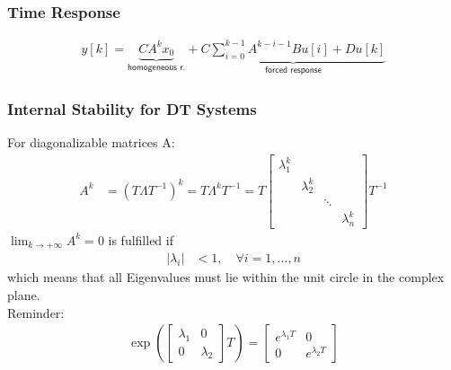 \subsubsection{Time Response}
\noindent\begin{align*}
    y[k]=\underbrace{CA^{k}x_0}_{\textsf{homogeneous r.}} + \underbrace{C\sum_{i=0}^{k-1}A^{k-i-1}Bu[i]+Du[k]}_{\textsf{forced response}}
\end{align*}
\subsubsection{Internal Stability for DT Systems}

For diagonalizable matrices A:\
\noindent\begin{align*}
    A^k & ={(T\Lambda T^{-1})}^k=T\Lambda^{k}T^{-1}=T\begin{bmatrix}\lambda_1^k&&&\\&\lambda_2^k&&\\&&\ddots&\\&&&\lambda_n^k\end{bmatrix}T^{-1}
\end{align*}
$\lim_{k\to+\infty}A^k=0$ is fulfilled if
\noindent\begin{align*}
    |\lambda_i| & <1,\quad\forall i=1,\ldots,n
\end{align*}
which means that all Eigenvalues must lie within the unit circle in the complex plane.\\
Reminder:
\noindent\begin{align*}
    \exp\left(\begin{bmatrix}\lambda_1&0\\0&\lambda_2\end{bmatrix}T\right) = \begin{bmatrix}e^{\lambda_{1}T}&0\\0&e^{\lambda_{2}T}\end{bmatrix}
\end{align*}


